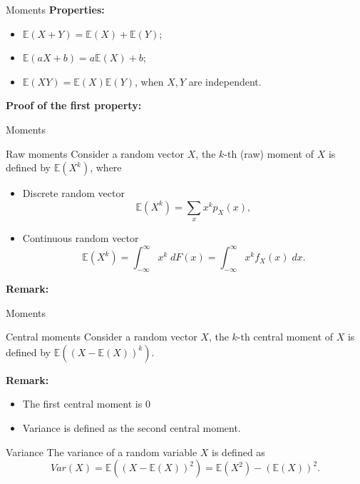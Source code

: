 \documentclass [aspectratio=169]{beamer}
\begin{document}
\begin{frame}{Moments}
\textbf{Properties:} 
\begin{itemize}
    \item $\mathbb{E}(X+Y) = \mathbb{E}(X) + \mathbb{E}(Y)$;
    \item $\mathbb{E}(aX + b) = a\mathbb{E}(X) + b$;
    \item $\mathbb{E}(XY) = \mathbb{E}(X)\mathbb{E}(Y)$, when $X, Y$ are independent.
\end{itemize}
\vspace{0.1in}
\textbf{Proof of the first property:}
\vspace{1.5in}
\end{frame}


\begin{frame}{Moments}
\begin{block}{Raw moments}
Consider a random vector $X$, the $k$-th (raw) moment of $X$ is defined by $\mathbb{E}(X^k)$, where 
\begin{itemize}
    \item Discrete random vector
    $$
    \mathbb{E}(X^k) = \sum_{x}x^k p_X(x),
    $$
    \item Continuous random vector
    $$
    \mathbb{E}(X^k) = \int_{-\infty}^\infty x^k \;dF(x) = \int_{-\infty}^\infty x^kf_X(x)\;dx.
    $$
\end{itemize}
\end{block}
\vspace{0.1in}
\textbf{Remark:} \\
\vspace{0.5in}
\end{frame}

\begin{frame}{Moments}
\begin{block}{Central moments}
Consider a random vector $X$, the $k$-th central moment of $X$ is defined by $\mathbb{E}((X - \mathbb{E}(X))^k)$.
\end{block}
\vspace{0.1in}
\textbf{Remark:} \\
\begin{itemize}
    \item The first central moment is $0$
    \item Variance is defined as the second central moment.
\end{itemize}
\begin{block}{Variance}
The variance of a random variable $X$ is defined as
$$
Var(X) = \mathbb{E}((X - \mathbb{E}(X))^2) = \mathbb{E}(X^2) - (\mathbb{E}(X))^2.
$$
\end{block}
\end{frame}
\end{document}
